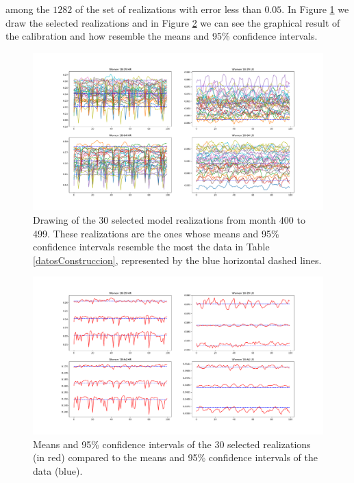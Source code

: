 among the $1282$ of the set of realizations with error less than $0.05$. In Figure \ref{fig:laselegidas} we draw the selected realizations and in Figure \ref{fig:ajuste95IC} we can see the graphical result of the calibration and how resemble the means and 95\% confidence intervals.  

\begin{figure}[h!]
	\centering
	\includegraphics[width=\linewidth]{IMGs/1.-Calibrado/Selected.pdf}
	\caption{Drawing of the $30$ selected model realizations from month 400 to 499. These realizations are the ones whose means and 95\% confidence intervals resemble the most the data in Table \ref{datosConstruccion}, represented by the blue horizontal dashed lines.}
	\label{fig:laselegidas}
\end{figure}

\begin{figure}[h!]
	\centering
	\includegraphics[width=\linewidth]{IMGs/1.-Calibrado/Ajuste_95IC.pdf}
	\caption{Means and 95\% confidence intervals of the $30$ selected realizations (in red) compared to the means and 95\% confidence intervals of the data (blue).}
	\label{fig:ajuste95IC}
\end{figure}

